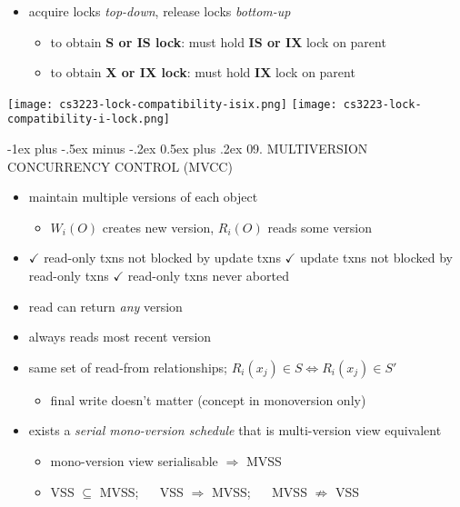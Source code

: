 \documentclass[10pt, landscape]{article}
\makeatletter
\renewcommand{\section}{\@startsection{section}{1}{0mm}%
  {-1ex plus -.5ex minus -.2ex}%
  {0.5ex plus .2ex}%
{\normalfont\large\bfseries}}
\makeatother
\begin{document}
\begin{multicols*}{4}
  \begin{itemize}
    \item acquire locks \textit{top-down}, release locks \textit{bottom-up}
          \begin{itemize}
            \item to obtain \textbf{S or IS lock}: must hold \textbf{IS or IX} lock on parent
            \item to obtain \textbf{X or IX lock}: must hold \textbf{IX} lock on parent
          \end{itemize}
  \end{itemize}

  \texttt{[image: cs3223-lock-compatibility-isix.png]}
  \texttt{[image: cs3223-lock-compatibility-i-lock.png]}

  \section{09. MULTIVERSION CONCURRENCY CONTROL (MVCC)}

  \begin{itemize}
    \item maintain multiple versions of each object
          \begin{itemize}
            \item  $W_i(O)$ creates new version, $R_i(O)$ reads some version
          \end{itemize}
    \item $\checkmark$ read-only txns not blocked by update txns $\checkmark$ update txns not blocked by read-only txns $\checkmark$ read-only txns never aborted
    \item {} read can return \textit{any} version
    \item {} always reads most recent version
    \item {} same set of read-from relationships; $R_i(x_j) \in S \iff R_i(x_j) \in S'$
          \begin{itemize}
            \item final write doesn't matter (concept in monoversion only)
          \end{itemize}
    \item {} exists a \textit{serial mono-version schedule} that is multi-version view equivalent
          \begin{itemize}
            \item mono-version view serialisable $\Rightarrow$ MVSS
            \item VSS $\subseteq$ MVSS; $\quad$ VSS $\Rightarrow$ MVSS; $\quad$ MVSS $\not\Rightarrow$ VSS
          \end{itemize}
  \end{itemize}


\end{multicols*}
\end{document}
